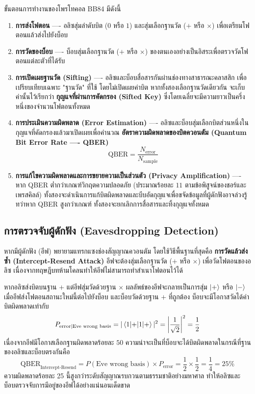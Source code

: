 ขั้นตอนการทำงานของโพรโทคอล BB84 มีดังนี้
\begin{enumerate}
    \item \textbf{การส่งโฟตอน} ---- อลิซสุ่มลำดับบิต ($0$ หรือ $1$) และสุ่มเลือกฐานวัด ($+$ หรือ $\times$) เพื่อเตรียมโฟตอนแล้วส่งไปยังบ็อบ
    \item \textbf{การวัดของบ็อบ} ---- บ็อบสุ่มเลือกฐานวัด ($+$ หรือ $\times$) ของตนเองอย่างเป็นอิสระเพื่อตรวจวัดโฟตอนแต่ละตัวที่ได้รับ
    \item \textbf{การเปิดเผยฐานวัด (Sifting)} ---- อลิซและบ็อบสื่อสารกันผ่านช่องทางสาธารณะคลาสสิก เพื่อเปรียบเทียบเฉพาะ "ฐานวัด" ที่ใช้ โดยไม่เปิดเผยค่าบิต หากทั้งสองเลือกฐานวัดเดียวกัน จะเก็บค่านั้นไว้เรียกว่า \textbf{กุญแจที่ผ่านการคัดกรอง (Sifted Key)} ซึ่งโดยเฉลี่ยจะมีความยาวเป็นครึ่งหนึ่งของจำนวนโฟตอนทั้งหมด
    \item \textbf{การประเมินความผิดพลาด (Error Estimation)} ---- อลิซและบ็อบสุ่มเลือกบิตส่วนหนึ่งในกุญแจที่คัดกรองแล้วมาเปิดเผยเพื่อคำนวณ \textbf{อัตราความผิดพลาดของบิตควอนตัม (Quantum Bit Error Rate ---- QBER)}
    \begin{equation}
    \text{QBER} = \frac{N_{\text{error}}}{N_{\text{sample}}}
    \end{equation}
    \item \textbf{การแก้ไขความผิดพลาดและการขยายความเป็นส่วนตัว (Privacy Amplification)} ---- หาก QBER ต่ำกว่าเกณฑ์วิกฤตความปลอดภัย (ประมาณร้อยละ $11$ ตามข้อพิสูจน์ของชอร์และเพรสคิลล์) ทั้งสองจะดำเนินการแก้บิตผิดพลาดและบีบอัดกุญแจเพื่อขจัดข้อมูลที่ผู้ดักฟังอาจล่วงรู้ ทว่าหาก QBER สูงกว่าเกณฑ์ ทั้งสองจะยกเลิกการสื่อสารและทิ้งกุญแจทั้งหมด
\end{enumerate}

\subsection{การตรวจจับผู้ดักฟัง (Eavesdropping Detection)}
หากมีผู้ดักฟัง (อีฟ) พยายามแทรกแซงช่องสัญญาณควอนตัม โดยใช้วิธีพื้นฐานที่สุดคือ \textbf{การวัดแล้วส่งซ้ำ (Intercept-Resend Attack)} อีฟจะต้องสุ่มเลือกฐานวัด ($+$ หรือ $\times$) เพื่อวัดโฟตอนของอลิซ เนื่องจากทฤษฎีบทห้ามโคลนทำให้อีฟไม่สามารถทำสำเนาโฟตอนไว้ได้

หากอลิซส่งบิตบนฐาน $+$ แต่อีฟสุ่มวัดด้วยฐาน $\times$ ผลลัพธ์ของอีฟจะกลายเป็นการสุ่ม $\ket{+}$ หรือ $\ket{-}$ เมื่ออีฟส่งโฟตอนสถานะใหม่นี้ต่อไปยังบ็อบ และบ็อบวัดด้วยฐาน $+$ ที่ถูกต้อง บ็อบจะมีโอกาสวัดได้ค่าบิตผิดพลาดเท่ากับ
\begin{equation}
P_{\text{error|Eve wrong basis}} = |\braket{1|+}|^2 = \left|\frac{1}{\sqrt{2}}\right|^2 = \frac{1}{2}
\end{equation}
เนื่องจากอีฟมีโอกาสเลือกฐานผิดพลาดร้อยละ $50$ ความน่าจะเป็นที่บ็อบจะได้บิตผิดพลาดในกรณีที่ฐานของอลิซและบ็อบตรงกันคือ
\begin{equation}
\text{QBER}_{\text{Intercept-Resend}} = P(\text{Eve wrong basis}) \times P_{\text{error}} = \frac{1}{2} \times \frac{1}{2} = \frac{1}{4} = 25\%
\end{equation}
ความผิดพลาดร้อยละ 25 นี้สูงกว่าระดับสัญญาณรบกวนตามธรรมชาติอย่างมหาศาล ทำให้อลิซและบ็อบตรวจจับการมีอยู่ของอีฟได้อย่างแน่นอนเด็ดขาด

